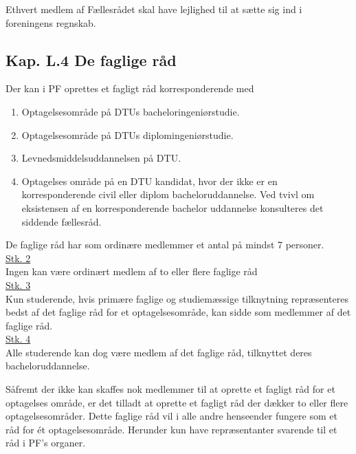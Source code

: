 \begin{list}
\item Ethvert medlem af Fællesrådet skal have lejlighed til at sætte sig ind i foreningens regnskab.


\subsection*{Kap. L.4 De faglige råd}
\label{L:kap:Faglige}

\item Der kan i PF oprettes et fagligt råd korresponderende med
	\begin{enumerate}
	\item Optagelsesområde på DTUs bacheloringeniørstudie.
	\item Optagelsesområde på DTUs diplomingeniørstudie.
	\item Levnedsmiddelsuddannelsen på DTU.
	\item Optagelses område på en DTU kandidat, hvor der ikke er en korresponderende civil eller diplom bacheloruddannelse. Ved tvivl om eksistensen af en korresponderende bachelor uddannelse konsulteres det siddende fællesråd.
	\end{enumerate}     
    
\item De faglige råd har som ordinære medlemmer et antal på mindst 7 personer.\\

\underline{Stk. 2} \\
Ingen kan være ordinært medlem af to eller flere faglige råd\\

\underline{Stk. 3} \\
Kun studerende, hvis primære faglige og studiemæssige tilknytning repræsenteres bedst af det faglige råd for et optagelsesområde, kan sidde som medlemmer af det faglige råd.\\

\underline{Stk. 4} \\ 
Alle studerende kan dog være medlem af det faglige råd, tilknyttet deres bacheloruddannelse.\\

\item Såfremt der ikke kan skaffes nok medlemmer til at oprette et fagligt råd for et optagelses område, er det tilladt at oprette et fagligt råd der dækker to eller flere optagelsesområder. Dette faglige råd vil i alle andre henseender fungere som et råd for ét optagelsesområde. Herunder kun have repræsentanter svarende til et råd i PF’s organer.\\


\end{list}
